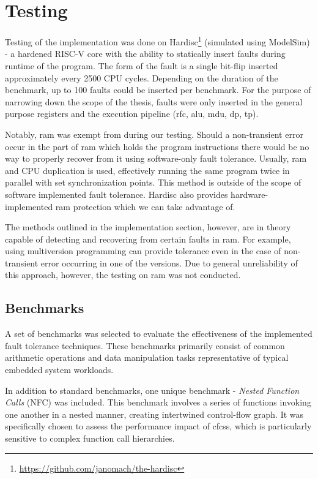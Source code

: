 \section{Testing}

Testing of the implementation was done on Hardisc\footnote{\url{https://github.com/janomach/the-hardisc}} (simulated using ModelSim) - a hardened RISC-V core with the ability to statically insert faults during runtime of the program. The form of the fault is a single bit-flip inserted approximately every 2500 CPU cycles. Depending on the duration of the benchmark, up to 100 faults could be inserted per benchmark. For the purpose of narrowing down the scope of the thesis, faults were only inserted in the general purpose registers and the execution pipeline (\acrshort{rfc}, \acrshort{alu}, \acrshort{mdu}, \acrshort{dp}, \acrshort{tp}).

Notably, \acrfull{ram} was exempt from  during our testing. Should a non-transient error occur in the part of \acrshort{ram} which holds the program instructions there would be no way to properly recover from it using software-only fault tolerance. Usually, \acrshort{ram} and CPU duplication is used, effectively running the same program twice in parallel with set synchronization points. This method is outside of the scope of software implemented fault tolerance. Hardisc also provides hardware-implemented \acrshort{ram} protection which we can take advantage of.

The methods outlined in the implementation section, however, are in theory capable of detecting and recovering from certain faults in \acrshort{ram}. For example, using multiversion programming can provide tolerance even in the case of non-transient error occurring in one of the versions. Due to general unreliability of this approach, however, the testing on \acrshort{ram}  was not conducted.

\subsection{Benchmarks}

A set of benchmarks was selected to evaluate the effectiveness of the implemented fault tolerance techniques. These benchmarks primarily consist of common arithmetic operations and data manipulation tasks representative of typical embedded system workloads. 

In addition to standard benchmarks, one unique benchmark - \textit{Nested Function Calls} (NFC) was included. This benchmark involves a series of functions invoking one another in a nested manner, creating intertwined control-flow graph. It was specifically chosen to assess the performance impact of \acrshort{cfcss}, which is particularly sensitive to complex function call hierarchies.

